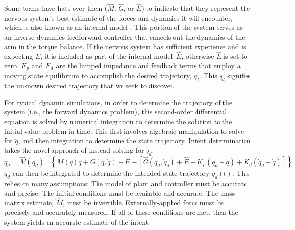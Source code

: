 \documentclass[10pt]{article}
\begin{document}
Some terms have hats over them ($\hat{M}$, $\hat{G}$, or $\hat{E}$) to indicate that they represent the nervous system's best estimate of the forces and dynamics it will encounter, which is also known as an internal model \cite{shadmehr1994adaptive}. This portion of the system serves as an inverse-dynamics feedforward controller that cancels out the dynamics of the arm in the torque balance. If the nervous system has sufficient experience and is expecting $E$, it is included as part of the internal model, $\hat{E}$, otherwise $\hat{E}$ is set to zero. $K_p$ and $K_d$ are the lumped impedance and feedback terms that employ a moving state equilibrium to accomplish the desired trajectory, $q_d$. This $q_d$ signifies the unknown desired trajectory that we seek to discover.

For typical dynamic simulations, in order to determine the trajectory of the system (i.e., the forward dynamics problem), this second-order differential equation is solved by numerical integration to determine the solution to the initial value problem in time. This first involves algebraic manipulation to solve for $\ddot{q}$, and then integration to determine the state trajectory. Intent determination takes the novel approach of instead solving for $\ddot{q}_d$:
\begin{equation}
\ddot{q}_d=\hat{M}(q_d)^{-1}\left\{M(q)\ddot{q}+G(q,\dot{q})+E-[\hat{G}(q_d,\dot{q}_d)+\hat{E}+K_p(q_d-q)+K_d(\dot{q}_d-\dot{q})]\right\}
\end{equation}  
$\ddot{q}_d$ can then be integrated to determine the intended state trajectory $q_d(t)$. This relies on many assumptions: The model of plant and controller must be accurate and precise. The initial conditions must be available and accurate. The mass matrix estimate, $\hat{M}$, must be invertible. Externally-applied force must be precisely and accurately measured. If all of these conditions are met, then the system yields an accurate estimate of the intent.
\end{document}
